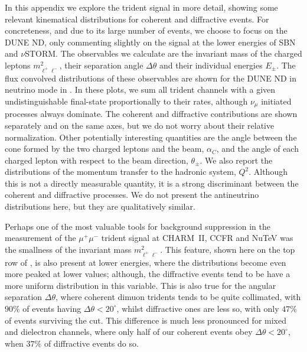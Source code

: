
\graphicspath{{}{appendices/figs/}{appendices/}}
\label{subsec:kine}

In this appendix we explore the trident signal in more detail, showing some relevant kinematical distributions for coherent and diffractive events. For concreteness, and due to its large number of events, we choose to focus on the DUNE ND, only commenting slightly on the signal at the lower energies of SBN and $\nu$STORM. The observables we calculate are the invariant mass of the charged leptons $m^2_{\ell^+ \ell^-}$, their separation angle $\Delta \theta$ and their individual energies $E_\pm$. The flux convolved distributions of these observables are shown for the DUNE ND in neutrino mode in . In these plots, we sum all trident channels with a given undistinguishable final-state proportionally to their rates, although $\nu_\mu$ initiated processes always dominate. The coherent and diffractive contributions are shown separately and on the same axes, but we do not worry about their relative normalization. Other potentially interesting quantities are the angle between the cone formed by the two charged leptons and the beam, $\alpha_C$, and the angle of each charged lepton with respect to the beam direction, $\theta_\pm$. We also report the distributions of the momentum transfer to the hadronic system, $Q^2$. Although this is not a directly measurable quantity, it is a strong discriminant between the coherent and diffractive processes. We do not present the antineutrino distributions here, but they are qualitatively similar.

Perhaps one of the most valuable tools for background suppression in the measurement of the $\mu^+\mu^-$ trident signal at CHARM~II, CCFR and NuTeV \cite{Geiregat:1990gz,Mishra:1991bv,Adams:1998yf} was the smallness of the invariant mass $m^2_{\ell^+ \ell^-}$. This feature, shown here on the top row of , is also present at lower energies, where the distributions become even more peaked at lower values; although, the diffractive events tend to be have a more uniform distribution in this variable. This is also true for the angular separation $\Delta \theta$, where coherent dimuon tridents tends to be quite collimated, with $90\%$ of events having $\Delta \theta < 20^\circ$, whilst diffractive ones are less so, with only $47\%$ of events surviving the cut. This difference is much less pronounced for mixed and dielectron channels, where only half of our coherent events obey $\Delta \theta < 20^\circ$, when $37\%$ of diffractive events do so.

